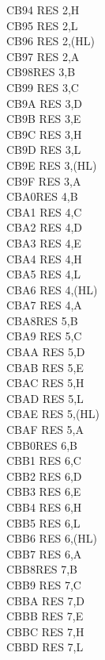 \begin{multicols}{3}
{\begin{tabbing}
    CB94\> 	RES 2,H\\
    CB95\> 	RES 2,L\\
    CB96\> 	RES 2,(HL)\\
    CB97\> 	RES 2,A\\
    CB98\>RES 3,B\\
    CB99\> 	RES 3,C\\
    CB9A\> 	RES 3,D\\
    CB9B\> 	RES 3,E\\
    CB9C\> 	RES 3,H\\
    CB9D\> 	RES 3,L\\
    CB9E\> 	RES 3,(HL)\\
    CB9F\> 	RES 3,A\\
    CBA0\>RES 4,B\\
    CBA1\> 	RES 4,C\\
    CBA2\> 	RES 4,D\\
    CBA3\> 	RES 4,E\\
    CBA4\> 	RES 4,H\\
    CBA5\> 	RES 4,L\\
    CBA6\> 	RES 4,(HL)\\
    CBA7\> 	RES 4,A\\
    CBA8\>RES 5,B\\
    CBA9\> 	RES 5,C\\
    CBAA\> 	RES 5,D\\
    CBAB\> 	RES 5,E\\
    CBAC\> 	RES 5,H\\
    CBAD\> 	RES 5,L\\
    CBAE\> 	RES 5,(HL)\\
    CBAF\> 	RES 5,A\\
    CBB0\>RES 6,B\\
    CBB1\> 	RES 6,C\\
    CBB2\> 	RES 6,D\\
    CBB3\> 	RES 6,E\\
    CBB4\> 	RES 6,H\\
    CBB5\> 	RES 6,L\\
    CBB6\> 	RES 6,(HL)\\
    CBB7\> 	RES 6,A\\
    CBB8\>RES 7,B\\
    CBB9\> 	RES 7,C\\
    CBBA\> 	RES 7,D\\
    CBBB\> 	RES 7,E\\
    CBBC\> 	RES 7,H\\
    CBBD\> 	RES 7,L\\

\end{tabbing}}
\end{multicols}
